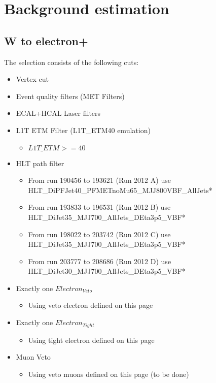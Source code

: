 \section{Background estimation}

\subsection{W to \texorpdfstring{electron+\MET}{electron+MET}}

The selection consists of the following cuts:

\begin{itemize}
  \item Vertex cut
  \item Event quality filters (MET Filters)
  \item ECAL+HCAL Laser filters
  \item L1T ETM Filter (L1T\_ETM40 emulation)
  \begin{itemize}
    \item $ L1T\_ETM >= 40 $
  \end{itemize}
  \item HLT path filter
  \begin{itemize}
    \item From run 190456 to 193621 (Run 2012 A) use HLT\_DiPFJet40\_PFMETnoMu65\_MJJ800VBF\_AllJets* 
    \item From run 193833 to 196531 (Run 2012 B) use HLT\_DiJet35\_MJJ700\_AllJets\_DEta3p5\_VBF*
    \item From run 198022 to 203742 (Run 2012 C) use HLT\_DiJet35\_MJJ700\_AllJets\_DEta3p5\_VBF*
    \item From run 203777 to 208686 (Run 2012 D) use HLT\_DiJet30\_MJJ700\_AllJets\_DEta3p5\_VBF*
  \end{itemize}
  \item Exactly one $Electron_{Veto}$
  \begin{itemize}
    \item Using veto electron defined on this page
  \end{itemize}
  \item Exactly one $Electron_{Tight}$
  \begin{itemize}
    \item Using tight electron defined on this page
  \end{itemize}
  \item Muon Veto
  \begin{itemize}
    \item Using veto muons defined on this page (to be done)

\end{itemize}
\end{itemize}
